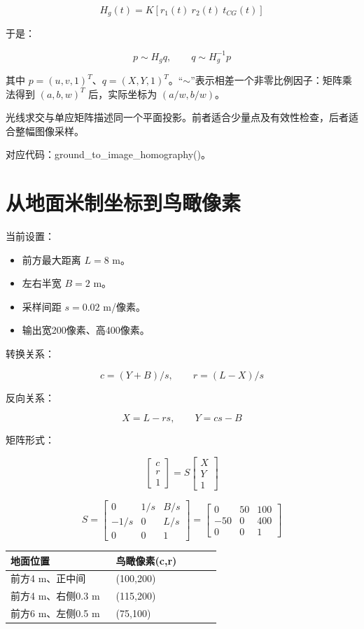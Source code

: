 \documentclass[UTF8,a4paper,11pt,fontset=windows]{ctexart}
\begin{document}
\[
H_g(t)=K[r_1(t)\ r_2(t)\ t_{CG}(t)]
\]

于是：


\[
p\sim H_gq,\qquad q\sim H_g^{-1}p
\]

其中 \(p=(u,v,1)^T\)、\(q=(X,Y,1)^T\)。“\(\sim\)”表示相差一个非零比例因子：矩阵乘法得到 \((a,b,w)^T\) 后，实际坐标为 \((a/w,b/w)\)。


光线求交与单应矩阵描述同一个平面投影。前者适合少量点及有效性检查，后者适合整幅图像采样。


对应代码：ground\_to\_image\_homography()。


\section{从地面米制坐标到鸟瞰像素}

当前设置：


\begin{itemize}
\item 前方最大距离 \(L=8\) m。
\item 左右半宽 \(B=2\) m。
\item 采样间距 \(s=0.02\) m/像素。
\item 输出宽200像素、高400像素。
\end{itemize}

转换关系：


\[
c=(Y+B)/s,\qquad r=(L-X)/s
\]

反向关系：


\[
X=L-rs,\qquad Y=cs-B
\]

矩阵形式：


\[
\begin{bmatrix}c\\r\\1\end{bmatrix}
=
S\begin{bmatrix}X\\Y\\1\end{bmatrix}
\]

\[
S=\begin{bmatrix}0&1/s&B/s\\-1/s&0&L/s\\0&0&1\end{bmatrix}
=\begin{bmatrix}0&50&100\\-50&0&400\\0&0&1\end{bmatrix}
\]

{\small\setlength{\tabcolsep}{3pt}\begin{longtable}{>{\raggedright\arraybackslash}p{0.47\linewidth}>{\raggedright\arraybackslash}p{0.47\linewidth}}\toprule
\textbf{地面位置} & \textbf{鸟瞰像素(c,r)}\\\midrule\endhead
前方4 m、正中间 & (100,200)\\
前方4 m、右侧0.3 m & (115,200)\\
前方6 m、左侧0.5 m & (75,100)\\
\bottomrule\end{longtable}}
\end{document}
